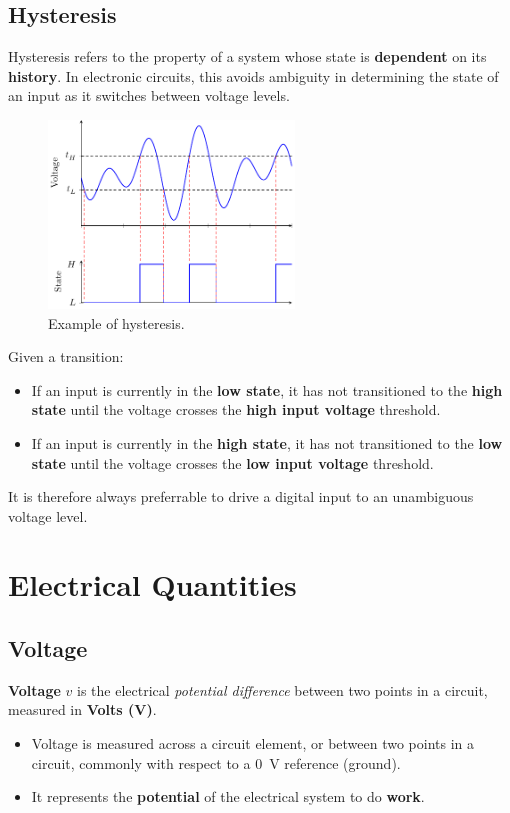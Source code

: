 \documentclass[a4paper]{report}
\begin{document}
\subsection{Hysteresis}
Hysteresis refers to the property of a system whose state is \textbf{dependent} on
its \textbf{history}. In electronic circuits, this avoids ambiguity in determining
the state of an input as it switches between voltage levels.
\begin{figure}[H]
    \centering
    \includegraphics[height = 5cm, keepaspectratio = true]{figures/hysteresis.pdf}
    \caption{Example of hysteresis.} %
\end{figure}
Given a transition:
\begin{itemize}
    \item If an input is currently in the \textbf{low state}, it has not transitioned to the \textbf{high state} until the voltage crosses the \textbf{high input voltage} threshold.
    \item If an input is currently in the \textbf{high state}, it has not transitioned to the \textbf{low state} until the voltage crosses the \textbf{low input voltage} threshold.
\end{itemize}
It is therefore always preferrable to drive a digital input to an unambiguous voltage level.
\section{Electrical Quantities}
\subsection{Voltage}
\textbf{Voltage} \(v\) is the electrical \textit{potential difference} between two points in a circuit, measured in \textbf{Volts (\unit{V})}.
\begin{itemize}
    \item Voltage is measured across a circuit element, or between two points in a circuit, commonly with respect to a \qty{0}{V} reference (ground).
    \item It represents the \textbf{potential} of the electrical system to do \textbf{work}.
\end{itemize}
\end{document}
